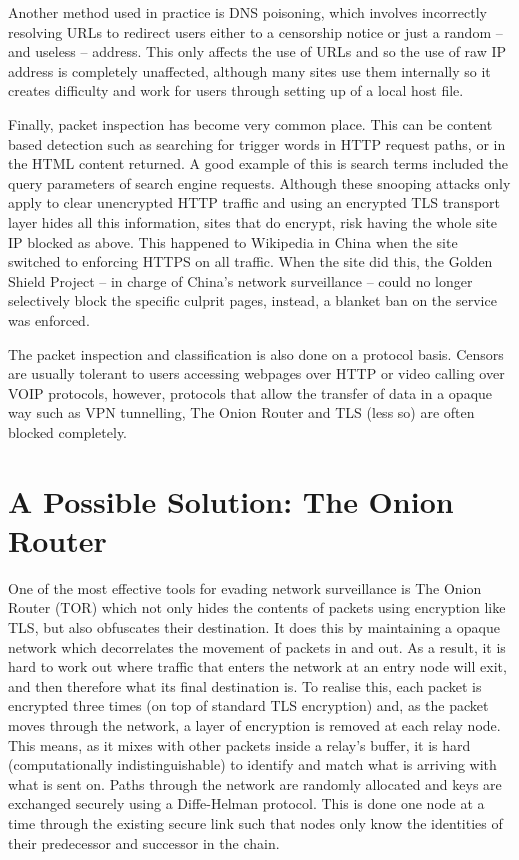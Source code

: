 \documentclass[ %
                    author={Samuel Russell},
                supervisor={Prof. Bogdan Warinschi},
                    degree={MEng},
                     title={Innocuous Ciphertexts},
                  subtitle={The DE-CENSOR Scheme},
                      type={research},
                      year={2018} ]{dissertation}
\begin{document}
Another method used in practice is DNS poisoning, which involves incorrectly resolving URLs to redirect users either to a censorship notice or just a random -- and useless -- address. This only affects the use of URLs and so the use of raw IP address is completely unaffected, although many sites use them internally so it creates difficulty and work for users through setting up of a local host file.

Finally, packet inspection has become very common place. This can be content based detection such as searching for trigger words in HTTP request paths, or in the HTML content returned. A good example of this is search terms included the query parameters of  search engine requests. Although these snooping attacks only apply to clear unencrypted HTTP traffic and using an encrypted  TLS transport layer hides all this information, sites that do encrypt, risk having the whole site IP blocked as above. This happened to Wikipedia in China when the site switched to enforcing HTTPS on all traffic. When the site did this, the Golden Shield Project -- in charge of China's network surveillance -- could no longer selectively block the specific culprit pages, instead, a blanket ban on the service was enforced.

The packet inspection and classification is also done on a protocol basis. Censors are usually tolerant to users accessing webpages over HTTP or video calling over VOIP protocols, however, protocols that allow the transfer of data in a opaque way such as VPN tunnelling, The Onion Router and TLS (less so) are often blocked completely.

\section{A Possible Solution: The Onion Router}

One of the most effective tools for evading network surveillance is The Onion Router (TOR) which not only hides the contents of packets using encryption like TLS, but also obfuscates their destination. It does this by maintaining a opaque network which decorrelates the movement of packets in and out. As a result, it is hard to work out where traffic that enters the network at an entry node will exit, and then therefore what its final destination is. To realise this, each packet is encrypted three times (on top of standard TLS encryption) and, as the packet moves through the network, a layer of encryption is removed at each relay node. This means, as it mixes with other packets inside a relay's buffer, it is hard (computationally indistinguishable) to identify and match what is arriving with what is sent on. Paths through the network are randomly allocated and keys are exchanged securely using a Diffe-Helman protocol. This is done one node at a time through the existing secure link such that nodes only know the identities of their predecessor and successor in the chain.
\end{document}
